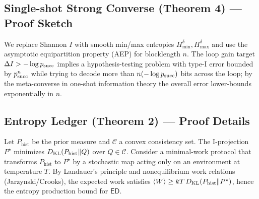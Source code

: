\subsection{Single-shot Strong Converse (Theorem 4) --- Proof Sketch}
We replace Shannon $I$ with smooth min/max entropies $H_{\min}^{\delta},H_{\max}^{\delta}$ and use the asymptotic equipartition property (AEP) for blocklength $n$. The loop gain target $\Delta I> -\log p_{\mathrm{succ}}$ implies a hypothesis-testing problem with type-I error bounded by $p_{\mathrm{succ}}^n$ while trying to decode more than $n(-\log p_{\mathrm{succ}})$ bits across the loop; by the meta-converse in one-shot information theory the overall error lower-bounds exponentially in $n$.

\subsection{Entropy Ledger (Theorem 2) --- Proof Details}
Let $P_{\text{hist}}$ be the prior measure and $\mathcal{C}$ a convex consistency set. The I-projection $P^\star$ minimizes $D_{\mathrm{KL}}(P_{\text{hist}}\Vert Q)$ over $Q\in\mathcal{C}$. Consider a minimal-work protocol that transforms $P_{\text{hist}}$ to $P^\star$ by a stochastic map acting only on an environment at temperature $T$. By Landauer's principle and nonequilibrium work relations (Jarzynski/Crooks), the expected work satisfies $\langle W\rangle\ge kT\,D_{\mathrm{KL}}(P_{\text{hist}}\Vert P^\star)$, hence the entropy production bound for $\mathsf{ED}$.
